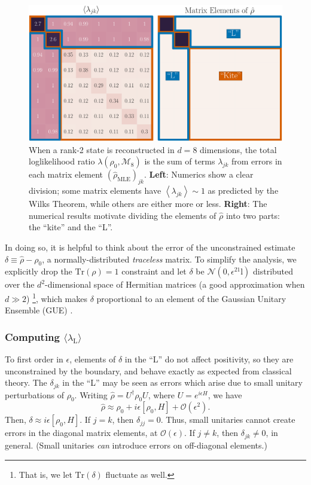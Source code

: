 \documentclass[aps,pra, twocolumn]{revtex4-1}
\newcommand{\Tr}{\mathrm{Tr}}
\newcommand{\expect}[1]{\ensuremath{\left\langle#1\right\rangle}}
\def\Id{1\!\mathrm{l}}
\newcommand{\rhohat}{\hat{\rho}}
\newcommand{\rhoMLE}{\rhohat_{\scriptscriptstyle\mathrm{MLE}}}
\begin{document}
\begin{figure}[h]
\includegraphics[width=\columnwidth]{Images/Figure_2.pdf}
 \caption{When a rank-2 state is reconstructed in $d=8$ dimensions, the total loglikelihood ratio $\lambda(\rho_0,\mathcal{M}_8)$ is the sum of terms $\lambda_{jk}$ from errors in each matrix element $(\rhoMLE)_{jk}$.  \textbf{Left}:  Numerics show a clear division; some matrix elements have $\expect{\lambda_{jk}}\sim1$ as predicted by the Wilks Theorem, while others are either more or less. \textbf{Right}:  The numerical results motivate dividing the elements of $\rhohat$ into two parts: the ``kite'' and the ``L''.}
\label{fig:L}
\end{figure}

In doing so, it is helpful to think about the error of the unconstrained estimate $\delta \equiv \hat\rho- \rho_{0}$, a normally-distributed \emph{traceless} matrix.  To simplify the analysis, we explicitly drop the $\Tr(\rho)=1$ constraint and let $\delta$ be $\mathcal{N}(0,\epsilon^2\Id)$ distributed over the $d^2$-dimensional space of Hermitian matrices (a good approximation when $d\gg2$) \footnote{That is, we let $\mathrm{Tr}(\delta)$ fluctuate as well.}, which makes $\delta$ proportional to an element of the Gaussian Unitary Ensemble (GUE) \cite{Fyodorov2005}.

\subsubsection{Computing $\langle \lambda_\mathrm{L}\rangle$}

To first order in $\epsilon$, elements of $\delta$ in the ``L'' do not affect positivity, so they are unconstrained by the boundary, and behave exactly as expected from classical theory. The $\delta_{jk}$ in the ``L'' may be seen as errors which arise due to small unitary perturbations of $\rho_{0}$. Writing $\rhohat = U^{\dagger}\rho_{0}U$, where $U=e^{i\epsilon H}$, we have
\[\rhohat \approx \rho_{0} + i\epsilon [\rho_{0},H]+\mathcal{O}(\epsilon^{2}).\]
Then, $\delta \approx i\epsilon [\rho_{0},H]$.
If $j = k$, then $\delta_{jj} = 0$. Thus, small unitaries cannot create errors in the diagonal matrix elements, at $\mathcal{O}(\epsilon)$. If $j \neq k$, then $\delta_{jk} \neq 0$, in general. (Small unitaries \emph{can} introduce errors on off-diagonal elements.)
\end{document}
